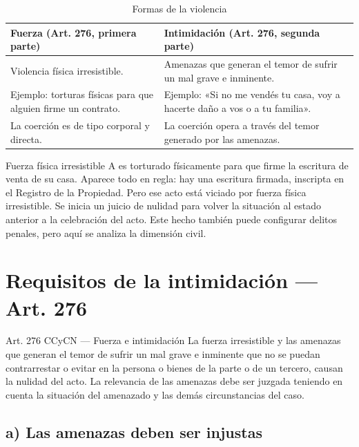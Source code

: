 \documentclass[12pt,oneside]{book}
\begin{document}
\begin{table}[H]
\centering
\begin{tabularx}{\textwidth}{>{\raggedright\arraybackslash}X >{\raggedright\arraybackslash}X}
\toprule
\textbf{Fuerza (Art. 276, primera parte)} & \textbf{Intimidación (Art. 276, segunda parte)} \\
\midrule
Violencia física irresistible. & Amenazas que generan el temor de sufrir un mal grave e inminente. \\[4pt]
Ejemplo: torturas físicas para que alguien firme un contrato. & Ejemplo: «Si no me vendés tu casa, voy a hacerte daño a vos o a tu familia». \\[4pt]
La coerción es de tipo corporal y directa. & La coerción opera a través del temor generado por las amenazas. \\
\bottomrule
\end{tabularx}
\caption{Formas de la violencia}
\end{table}

\begin{example}{Fuerza física irresistible}
A es torturado físicamente para que firme la escritura de venta de su casa. Aparece todo en regla: hay una escritura firmada, inscripta en el Registro de la Propiedad. Pero ese acto está viciado por fuerza física irresistible. Se inicia un juicio de nulidad para volver la situación al estado anterior a la celebración del acto. Este hecho también puede configurar delitos penales, pero aquí se analiza la dimensión civil.
\end{example}

\section{Requisitos de la intimidación --- Art. 276}

\begin{articulo}{Art. 276 CCyCN --- Fuerza e intimidación}
La fuerza irresistible y las amenazas que generan el temor de sufrir un mal grave e inminente que no se puedan contrarrestar o evitar en la persona o bienes de la parte o de un tercero, causan la nulidad del acto. La relevancia de las amenazas debe ser juzgada teniendo en cuenta la situación del amenazado y las demás circunstancias del caso.
\end{articulo}

\subsection*{a) Las amenazas deben ser injustas}
\end{document}
